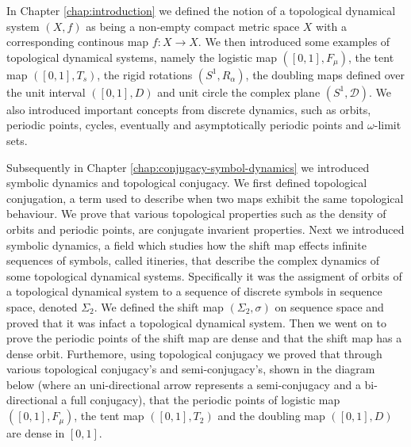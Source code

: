 In Chapter \ref{chap:introduction} we defined the notion of a topological dynamical system $(X, f)$ as being a non-empty compact metric space $X$ with a corresponding continous map $f: X \to X$. We then introduced some examples of topological dynamical systems, namely the logistic map $([0, 1], F_\mu)$, the tent map $([0, 1], T_s)$, the rigid rotations $(S^1, R_\alpha)$, the doubling maps defined over the unit interval $([0, 1], D)$ and unit circle the complex plane $(S^1, \mathcal{D})$. We also introduced important concepts from discrete dynamics, such as orbits, periodic points, cycles, eventually and asymptotically periodic points and $\omega$-limit sets.

Subsequently in Chapter \ref{chap:conjugacy-symbol-dynamics} we introduced symbolic dynamics and topological conjugacy. We first defined topological conjugation, a term used to describe when two maps exhibit the same topological behaviour. We prove that various topological properties such as the density of orbits and periodic points, are conjugate invarient properties. Next we introduced symbolic dynamics, a field which studies how the shift map effects infinite sequences of symbols, called itineries, that describe the complex dynamics of some topological dynamical systems. Specifically it was the assigment of orbits of a topological dynamical system to a sequence of discrete symbols in sequence space, denoted $\Sigma_2$. We defined the shift map $(\Sigma_2, \sigma)$ on sequence space and proved that it was infact a topological dynamical system. Then we went on to prove the periodic points of the shift map are dense and that the shift map has a dense orbit. Furthemore, using topological conjugacy we proved that through various topological conjugacy's and semi-conjugacy's, shown in the diagram below (where an uni-directional arrow represents a semi-conjugacy and a bi-directional a full conjugacy), that the periodic points of logistic map $([0, 1], F_\mu)$, the tent map $([0, 1], T_2)$ and the doubling map $([0, 1], D)$ are dense in $[0, 1]$.
